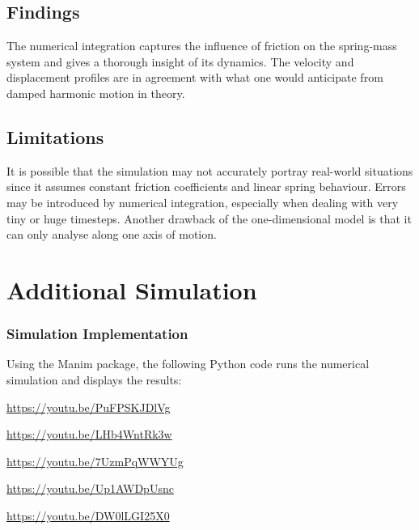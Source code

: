\documentclass[12pt, a4paper, oneside]{report}
\begin{document}
\section{Findings}

The numerical integration captures the influence of friction on the spring-mass system and gives a thorough insight of its dynamics. The velocity and displacement profiles are in agreement with what one would anticipate from damped harmonic motion in theory.

\section{Limitations}

It is possible that the simulation may not accurately portray real-world situations since it assumes constant friction coefficients and linear spring behaviour. Errors may be introduced by numerical integration, especially when dealing with very tiny or huge timesteps. Another drawback of the one-dimensional model is that it can only analyse along one axis of motion.



\chapter{Additional Simulation}
\subsection{Simulation Implementation}

Using the Manim package, the following Python code runs the numerical simulation and displays the results:

\url{https://youtu.be/PuFPSKJDlVg}

\url{https://youtu.be/LHb4WntRk3w}

\url{https://youtu.be/7UzmPqWWYUg}

\url{https://youtu.be/Up1AWDpUsnc}

\url{https://youtu.be/DW0lLGI25X0}
\end{document}

